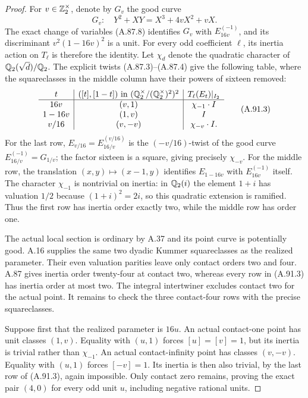 \begin{proof}
For $v\in\mathbb Z_2^\times$, denote by $G_v$ the good curve
\[
                G_v:\quad Y^2+XY=X^3+4vX^2+vX.
\tag{A.91.2}
\]
The exact change of variables (A.87.8) identifies
$G_v$ with $E_{16v}^{(-1)}$, and its discriminant
$v^2(1-16v)^2$ is a unit.
For every odd coefficient $\ell$, its inertia action on
$T_\ell$ is therefore the identity.
Let $\chi_d$ denote the quadratic character of
$\mathbb Q_2(\sqrt d)/\mathbb Q_2$.
The explicit twists (A.87.3)--(A.87.4) give the following
table, where the squareclasses in the middle column have
their powers of sixteen removed:
\[
\begin{array}{c|c|c}
 t & ([t],[1-t])\text{ in }(\mathbb Q_2^\times/(\mathbb Q_2^\times)^2)^2
                              & T_\ell(E_t)|_{I_2}\\ \hline
 16v &(v,1)&\chi_{-1}\cdot I\\
 1-16v &(1,v)&I\\
 v/16 &(v,-v)&\chi_{-v}\cdot I .
\end{array}
\tag{A.91.3}
\]
For the last row, $E_{v/16}=E_{16/v}^{(v/16)}$ is the
$(-v/16)$-twist of the good curve
$E_{16/v}^{(-1)}=G_{1/v}$; the factor sixteen is a
square, giving precisely $\chi_{-v}$.
For the middle row, the translation
$(x,y)\mapsto(x-1,y)$ identifies $E_{1-16v}$ with
$E_{16v}^{(-1)}$ itself.
The character $\chi_{-1}$ is nontrivial on inertia:
in $\mathbb Q_2(i)$ the element $1+i$ has valuation $1/2$
because $(1+i)^2=2i$, so this quadratic extension
is ramified.  Thus the first row has inertia order
exactly two, while the middle row has order one.

The actual local section is ordinary by A.37 and its
point curve is potentially good.  A.16 supplies the
same two dyadic Kummer squareclasses as the realized
parameter.  Their even valuation parities leave only
contact orders two and four.
A.87 gives inertia order twenty-four at contact two,
whereas every row in (A.91.3) has inertia order at
most two.  The integral intertwiner excludes contact
two for the actual point.  It remains to check the
three contact-four rows with the precise squareclasses.

Suppose first that the realized parameter is $16u$.
An actual contact-one point has unit classes $(1,v)$.
Equality with $(u,1)$ forces $[u]=[v]=1$, but its
inertia is trivial rather than $\chi_{-1}$.
An actual contact-infinity point has classes $(v,-v)$.
Equality with $(u,1)$ forces $[-v]=1$.
Its inertia is then also trivial, by the last row of
(A.91.3), again impossible.
Only contact zero remains, proving the exact pair
$(4,0)$ for every odd unit $u$, including negative
rational units.


\end{proof}
